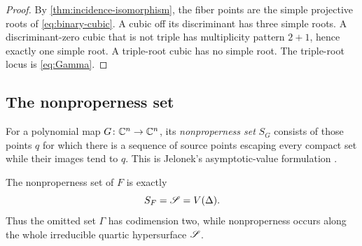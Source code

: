 \begin{proof}
By \cref{thm:incidence-isomorphism}, the fiber points are the simple projective roots of \eqref{eq:binary-cubic}.  A cubic off its discriminant has three simple roots.  A discriminant-zero cubic that is not triple has multiplicity pattern $2+1$, hence exactly one simple root.  A triple-root cubic has no simple root.  The triple-root locus is \eqref{eq:Gamma}.
\end{proof}

\subsection{The nonproperness set}

\begin{definition}\label{def:nonproperness-set}
For a polynomial map $G\colon\mathbb C^n\to\mathbb C^n$, its \emph{nonproperness set} $S_G$ consists of those points $q$ for which there is a sequence of source points escaping every compact set while their images tend to $q$.  This is Jelonek's asymptotic-value formulation \cite{Jelonek1993}.
\end{definition}

\begin{theorem}\label{thm:nonproperness}
The nonproperness set of $F$ is exactly
\[
  S_F=\mathscr S=V(\Delta).
\]
Thus the omitted set $\Gamma$ has codimension two, while nonproperness occurs along the whole irreducible quartic hypersurface $\mathscr S$.
\end{theorem}

